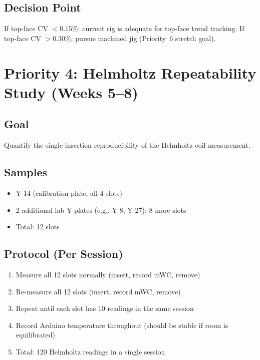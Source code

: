 \documentclass[11pt,letterpaper]{article}
\begin{document}
\subsection{Decision Point}

If top-face CV $< 0.15\%$: current rig is adequate for top-face trend tracking.
If top-face CV $> 0.30\%$: pursue machined jig (Priority~6 stretch goal).


\section{Priority 4: Helmholtz Repeatability Study (Weeks 5--8)}
\label{sec:p4}

\subsection{Goal}

Quantify the single-insertion reproducibility of the Helmholtz coil measurement.

\subsection{Samples}

\begin{itemize}[nosep]
  \item Y-14 (calibration plate, all 4 slots)
  \item 2 additional lab Y-plates (e.g., Y-8, Y-27): 8 more slots
  \item Total: 12 slots
\end{itemize}

\subsection{Protocol (Per Session)}

\begin{enumerate}[nosep]
  \item Measure all 12 slots normally (insert, record mWC, remove)
  \item Re-measure all 12 slots (insert, record mWC, remove)
  \item Repeat until each slot has 10 readings in the same session
  \item Record Arduino temperature throughout (should be stable if room is
    equilibrated)
  \item Total: 120 Helmholtz readings in a single session
\end{enumerate}
\end{document}
